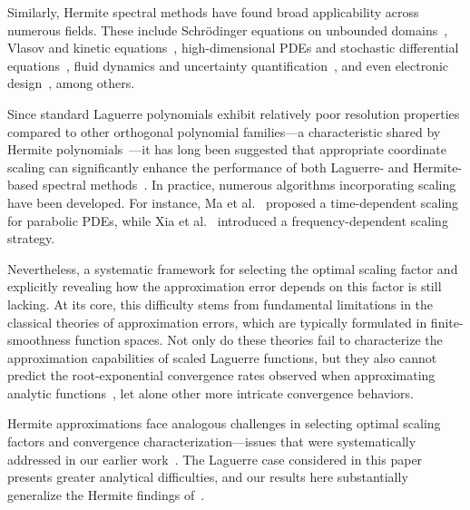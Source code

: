 \documentclass[pdflatex,sn-aps]{sn-jnl}%
\theoremstyle{thmstyleone}%
\theoremstyle{thmstyletwo}%
\theoremstyle{thmstylethree}%
\begin{document}
Similarly, Hermite spectral methods have found broad applicability across numerous fields. These include Schr\"odinger equations on unbounded domains~\cite{bao_fourth-order_2005,shen_error_2013,sheng_nontensorial_2021}, Vlasov and kinetic equations~\cite{shan_discretization_1998, mieussens_discrete-velocity_2000, gibelli_spectral_2006, cai_numerical_2010,Mizerova.She2018,funaro_stability_2021,zhang_error_2023}, 
high-dimensional PDEs and stochastic differential equations~\cite{luo_hermite_2013, zhang_sparse-grid_2013},
fluid dynamics and uncertainty quantification~\cite{cameron_orthogonal_1947,
meecham_wienerhermite_1964, orszag_dynamical_1967, xiu_modeling_2003,
venturi_wick-malliavin_2013, tang_discrete_2014, nobile_adaptive_2016,
wan_numerical_2019},
and even electronic design~\cite{manfredi_perturbative_2020, chen_analytical_2021}, among others.

Since standard Laguerre polynomials exhibit relatively poor resolution properties compared to other orthogonal polynomial families---a characteristic shared by Hermite polynomials~\cite{gottlieb_numerical_1977}---it has long been suggested that appropriate coordinate scaling can significantly
enhance the performance of both Laguerre- and Hermite-based spectral methods~\cite{tang1993hermite, shen2000stable}.
In practice, numerous algorithms incorporating scaling have been developed.
For instance, Ma et al.~\cite{ma_hermite_2005} proposed a time-dependent scaling for parabolic PDEs, while Xia et al.~\cite{xia_efficient_2021} introduced a frequency-dependent scaling strategy.

Nevertheless, a systematic framework for selecting the optimal scaling factor and explicitly revealing how the approximation error depends on this factor is still lacking.  At its core, this difficulty stems from fundamental limitations in the classical theories of approximation errors, which are typically formulated in finite-smoothness function spaces. Not only do these theories fail to characterize the approximation capabilities of scaled Laguerre functions, but they also cannot predict the root-exponential convergence rates observed when approximating analytic functions~\cite{wang2024convergence}, let alone other more intricate convergence behaviors.

Hermite approximations face analogous challenges in selecting optimal scaling factors and convergence characterization—issues that were systematically addressed in our earlier work~\cite{hu2024scaling}. 
The Laguerre case considered in this paper presents greater analytical difficulties, and our results here substantially generalize the Hermite findings of~\cite{hu2024scaling}.
\end{document}

